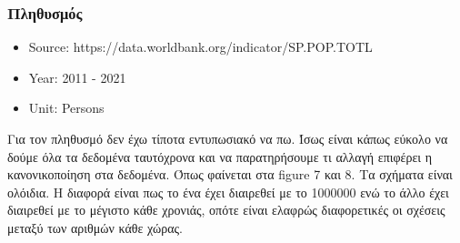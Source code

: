 \documentclass[a4paper,twoside,10pt]{article}
\begin{document}
\subsubsection{Πληθυσμός}
	\begin{itemize}
	\item Source: https://data.worldbank.org/indicator/SP.POP.TOTL
	\item Year: 2011 - 2021
	\item Unit: Persons
\end{itemize}   
Για τον πληθυσμό δεν έχω τίποτα εντυπωσιακό να πω. Ίσως είναι κάπως εύκολο να δούμε όλα τα δεδομένα ταυτόχρονα και να παρατηρήσουμε τι αλλαγή επιφέρει η κανονικοποίηση στα δεδομένα. Όπως φαίνεται στα figure 7 και 8. Τα σχήματα είναι ολόιδια. Η διαφορά είναι πως το ένα έχει διαιρεθεί με το 1000000 ενώ το άλλο έχει διαιρεθεί με το μέγιστο κάθε χρονιάς, οπότε είναι ελαφρώς διαφορετικές οι σχέσεις μεταξύ των αριθμών κάθε χώρας. 
\end{document}
